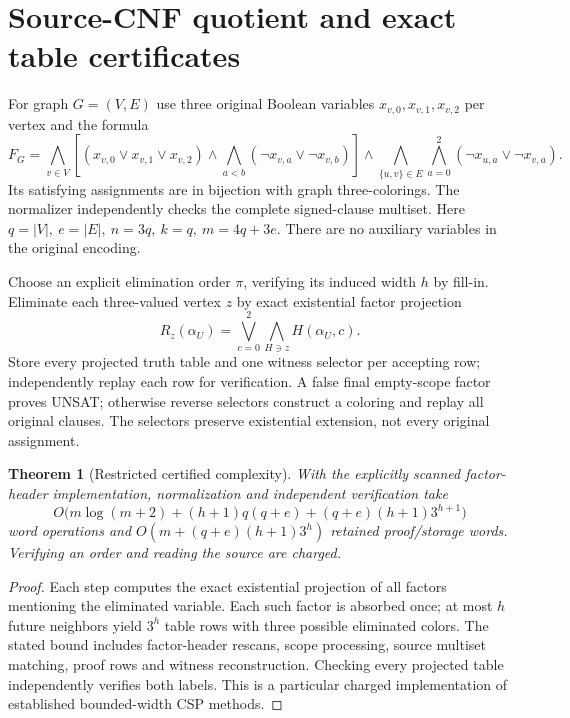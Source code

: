 \documentclass[11pt]{article}
\newtheorem{theorem}{Theorem}
\begin{document}
\section{Source-CNF quotient and exact table certificates}
For graph \(G=(V,E)\) use three original Boolean variables \(x_{v,0},x_{v,1},x_{v,2}\) per vertex and the formula
\[
F_G=\bigwedge_{v\in V}\left[(x_{v,0}\vee x_{v,1}\vee x_{v,2})
\wedge\bigwedge_{a<b}(\neg x_{v,a}\vee\neg x_{v,b})\right]
\wedge\bigwedge_{\{u,v\}\in E}\bigwedge_{a=0}^{2}
(\neg x_{u,a}\vee\neg x_{v,a}).
\]
Its satisfying assignments are in bijection with graph three-colorings. The normalizer independently checks the complete signed-clause multiset. Here \(q=|V|,\ e=|E|,\ n=3q,\ k=q,\ m=4q+3e\). There are no auxiliary variables in the original encoding.

Choose an explicit elimination order \(\pi\), verifying its induced width \(h\) by fill-in. Eliminate each three-valued vertex \(z\) by exact existential factor projection
\[
R_z(\alpha_U)=\bigvee_{c=0}^{2}\bigwedge_{H\ni z}H(\alpha_U,c).
\]
Store every projected truth table and one witness selector per accepting row; independently replay each row for verification. A false final empty-scope factor proves UNSAT; otherwise reverse selectors construct a coloring and replay all original clauses. The selectors preserve existential extension, not every original assignment.

\begin{theorem}[Restricted certified complexity]
With the explicitly scanned factor-header implementation, normalization and independent verification take
\[
O\bigl(m\log(m+2)+(h+1)q(q+e)+(q+e)(h+1)3^{h+1}\bigr)
\]
word operations and \(O(m+(q+e)(h+1)3^h)\) retained proof/storage words. Verifying an order and reading the source are charged.
\end{theorem}
\begin{proof}
Each step computes the exact existential projection of all factors mentioning the eliminated variable. Each such factor is absorbed once; at most \(h\) future neighbors yield \(3^h\) table rows with three possible eliminated colors. The stated bound includes factor-header rescans, scope processing, source multiset matching, proof rows and witness reconstruction. Checking every projected table independently verifies both labels. This is a particular charged implementation of established bounded-width CSP methods.
\end{proof}
\end{document}
